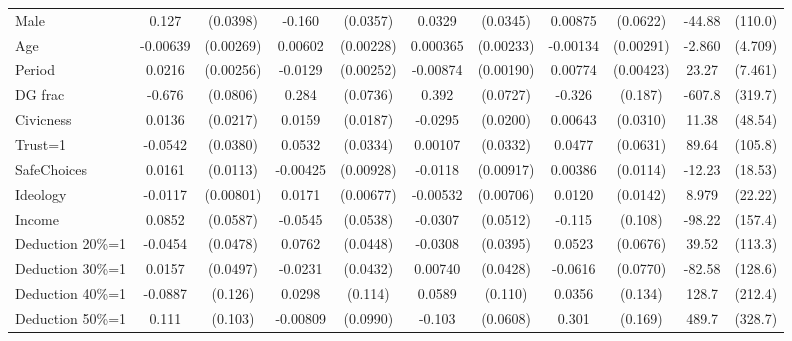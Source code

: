 \begin{tabular}{l|cccccc|cc|cc}
Male            &    0.127\sym{***}& (0.0398)&   -0.160\sym{***}& (0.0357)&   0.0329         & (0.0345)&  0.00875         & (0.0622)&   -44.88         &  (110.0)\\
Age             & -0.00639\sym{**} &(0.00269)&  0.00602\sym{***}&(0.00228)& 0.000365         &(0.00233)& -0.00134         &(0.00291)&   -2.860         &  (4.709)\\
Period          &   0.0216\sym{***}&(0.00256)&  -0.0129\sym{***}&(0.00252)& -0.00874\sym{***}&(0.00190)&  0.00774\sym{*}  &(0.00423)&    23.27\sym{***}&  (7.461)\\
DG frac         &   -0.676\sym{***}& (0.0806)&    0.284\sym{***}& (0.0736)&    0.392\sym{***}& (0.0727)&   -0.326\sym{*}  &  (0.187)&   -607.8\sym{*}  &  (319.7)\\
Civicness       &   0.0136         & (0.0217)&   0.0159         & (0.0187)&  -0.0295         & (0.0200)&  0.00643         & (0.0310)&    11.38         &  (48.54)\\
Trust=1         &  -0.0542         & (0.0380)&   0.0532         & (0.0334)&  0.00107         & (0.0332)&   0.0477         & (0.0631)&    89.64         &  (105.8)\\
SafeChoices     &   0.0161         & (0.0113)& -0.00425         &(0.00928)&  -0.0118         &(0.00917)&  0.00386         & (0.0114)&   -12.23         &  (18.53)\\
Ideology        &  -0.0117         &(0.00801)&   0.0171\sym{**} &(0.00677)& -0.00532         &(0.00706)&   0.0120         & (0.0142)&    8.979         &  (22.22)\\
Income          &   0.0852         & (0.0587)&  -0.0545         & (0.0538)&  -0.0307         & (0.0512)&   -0.115         &  (0.108)&   -98.22         &  (157.4)\\
Deduction 20\%=1&  -0.0454         & (0.0478)&   0.0762\sym{*}  & (0.0448)&  -0.0308         & (0.0395)&   0.0523         & (0.0676)&    39.52         &  (113.3)\\
Deduction 30\%=1&   0.0157         & (0.0497)&  -0.0231         & (0.0432)&  0.00740         & (0.0428)&  -0.0616         & (0.0770)&   -82.58         &  (128.6)\\
Deduction 40\%=1&  -0.0887         &  (0.126)&   0.0298         &  (0.114)&   0.0589         &  (0.110)&   0.0356         &  (0.134)&    128.7         &  (212.4)\\
Deduction 50\%=1&    0.111         &  (0.103)& -0.00809         & (0.0990)&   -0.103\sym{*}  & (0.0608)&    0.301\sym{*}  &  (0.169)&    489.7         &  (328.7)\\

\end{tabular}
